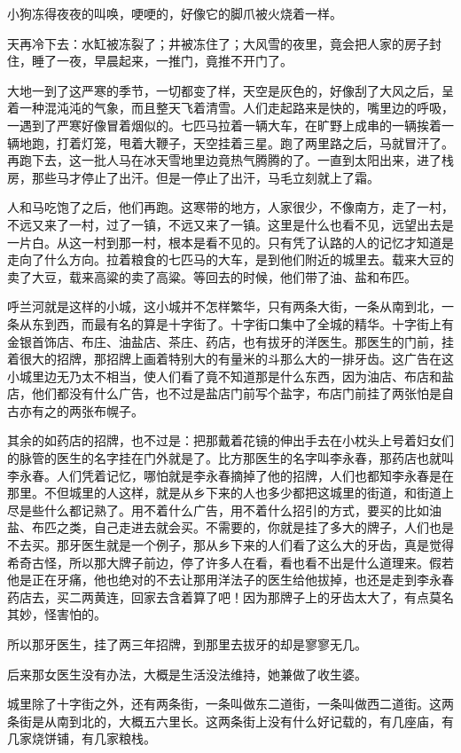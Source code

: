 \documentclass[UTF8]{ctexart}
\begin{document}
小狗冻得夜夜的叫唤，哽哽的，好像它的脚爪被火烧着一样。

天再冷下去：水缸被冻裂了；井被冻住了；大风雪的夜里，竟会把人家的房子封住，睡了一夜，早晨起来，一推门，竟推不开门了。

大地一到了这严寒的季节，一切都变了样，天空是灰色的，好像刮了大风之后，呈着一种混沌沌的气象，而且整天飞着清雪。人们走起路来是快的，嘴里边的呼吸，一遇到了严寒好像冒着烟似的。七匹马拉着一辆大车，在旷野上成串的一辆挨着一辆地跑，打着灯笼，甩着大鞭子，天空挂着三星。跑了两里路之后，马就冒汗了。再跑下去，这一批人马在冰天雪地里边竟热气腾腾的了。一直到太阳出来，进了栈房，那些马才停止了出汗。但是一停止了出汗，马毛立刻就上了霜。

人和马吃饱了之后，他们再跑。这寒带的地方，人家很少，不像南方，走了一村，不远又来了一村，过了一镇，不远又来了一镇。这里是什么也看不见，远望出去是一片白。从这一村到那一村，根本是看不见的。只有凭了认路的人的记忆才知道是走向了什么方向。拉着粮食的七匹马的大车，是到他们附近的城里去。载来大豆的卖了大豆，载来高粱的卖了高粱。等回去的时候，他们带了油、盐和布匹。

呼兰河就是这样的小城，这小城并不怎样繁华，只有两条大街，一条从南到北，一条从东到西，而最有名的算是十字街了。十字街口集中了全城的精华。十字街上有金银首饰店、布庄、油盐店、茶庄、药店，也有拔牙的洋医生。那医生的门前，挂着很大的招牌，那招牌上画着特别大的有量米的斗那么大的一排牙齿。这广告在这小城里边无乃太不相当，使人们看了竟不知道那是什么东西，因为油店、布店和盐店，他们都没有什么广告，也不过是盐店门前写个盐字，布店门前挂了两张怕是自古亦有之的两张布幌子。

其余的如药店的招牌，也不过是：把那戴着花镜的伸出手去在小枕头上号着妇女们的脉管的医生的名字挂在门外就是了。比方那医生的名字叫李永春，那药店也就叫李永春。人们凭着记忆，哪怕就是李永春摘掉了他的招牌，人们也都知李永春是在那里。不但城里的人这样，就是从乡下来的人也多少都把这城里的街道，和街道上尽是些什么都记熟了。用不着什么广告，用不着什么招引的方式，要买的比如油盐、布匹之类，自己走进去就会买。不需要的，你就是挂了多大的牌子，人们也是不去买。那牙医生就是一个例子，那从乡下来的人们看了这么大的牙齿，真是觉得希奇古怪，所以那大牌子前边，停了许多人在看，看也看不出是什么道理来。假若他是正在牙痛，他也绝对的不去让那用洋法子的医生给他拔掉，也还是走到李永春药店去，买二两黄连，回家去含着算了吧！因为那牌子上的牙齿太大了，有点莫名其妙，怪害怕的。

所以那牙医生，挂了两三年招牌，到那里去拔牙的却是寥寥无几。

后来那女医生没有办法，大概是生活没法维持，她兼做了收生婆。

城里除了十字街之外，还有两条街，一条叫做东二道街，一条叫做西二道街。这两条街是从南到北的，大概五六里长。这两条街上没有什么好记载的，有几座庙，有几家烧饼铺，有几家粮栈。
\end{document}
